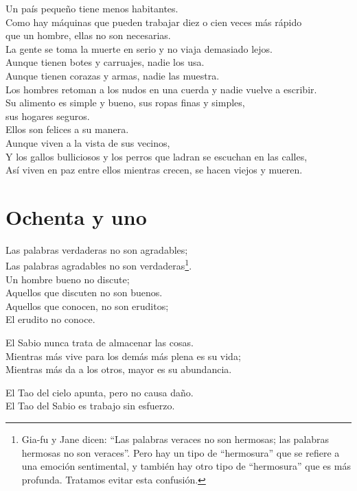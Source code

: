 \documentclass[hidelinks]{memoir}
\begin{document}
	Un país pequeño tiene menos habitantes.\\
	Como hay máquinas que pueden trabajar diez o cien veces más rápido\\
	que un hombre, ellas no son necesarias.\\
	La gente se toma la muerte en serio y no viaja demasiado lejos.\\
	Aunque tienen botes y carruajes, nadie los usa.\\
	Aunque tienen corazas y armas, nadie las muestra.\\
	Los hombres retoman a los nudos en una cuerda y nadie vuelve a
	escribir.\\
	Su alimento es simple y bueno, sus ropas finas y simples,\\
	sus hogares seguros.\\
	Ellos son felices a su manera.\\
	Aunque viven a la vista de sus vecinos,\\
	Y los gallos bulliciosos y los perros que ladran se escuchan en las
	calles,\\
	Así viven en paz entre ellos mientras crecen, se hacen viejos y mueren.
	
	\chapter*{Ochenta y uno}
	
	Las palabras verdaderas no son agradables;\\
	Las palabras agradables no son verdaderas\footnote{Gia-fu y Jane dicen: ``Las palabras veraces no son hermosas; las
		palabras hermosas no son veraces''. Pero hay un tipo de ``hermosura''
		que se refiere a una emoción sentimental, y también hay otro tipo de
		``hermosura'' que es más profunda. Tratamos evitar esta confusión.}.\\
	Un hombre bueno no discute;\\
	Aquellos que discuten no son buenos.\\
	Aquellos que conocen, no son eruditos;\\
	El erudito no conoce.
	
	El Sabio nunca trata de almacenar las cosas.\\
	Mientras más vive para los demás más plena es su vida;\\
	Mientras más da a los otros, mayor es su abundancia.
	
	El Tao del cielo apunta, pero no causa daño.\\
	El Tao del Sabio es trabajo sin esfuerzo.
	
\end{document}
